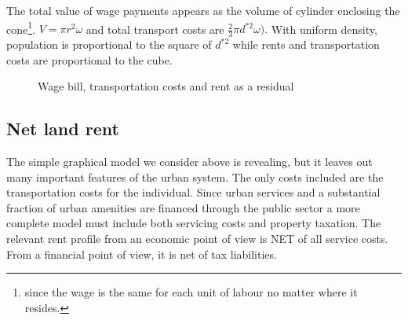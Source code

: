 The total value of wage payments appears as the volume of cylinder enclosing the cone\footnote{since the wage is the same for each unit of labour no matter where it resides.}.  
$V=\pi r^2 \omega$ 
and total transport costs are 
$\frac{2}{3}\pi  d^{*2} \omega).$
With uniform density, population is proportional to the square of  $d^{*2}$ while rents and  transportation costs are proportional to the cube. %

\begin{figure}
    \begin{center}
    
    \caption{Wage bill, transportation costs and rent as a residual  }
    \label{fig-city-conical}
    \end{center}
\end{figure}



\subsection{Net land rent} 
The simple graphical model we consider above is revealing, but it leaves out many important features of the urban system. The only costs included are the transportation costs for the individual.  Since urban services and  a substantial fraction of urban amenities are financed through the public sector a more complete model must include both servicing costs and property taxation. The relevant rent profile from an economic point of view is NET of all service costs. From a financial point of view, it is net of tax liabilities.%

